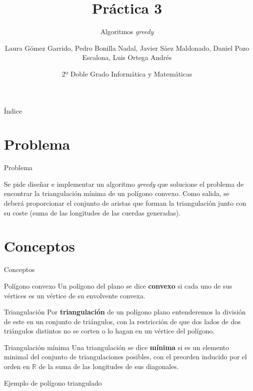 \documentclass[compress]{beamer}
\title{Práctica 3}                                               %
\subtitle{Algoritmos \textit{greedy}}                                  %
\author{Laura Gómez Garrido, Pedro Bonilla Nadal, Javier Sáez Maldonado, Daniel Pozo Escalona, Luis Ortega Andrés}
\date{2º Doble Grado Informática y Matemáticas}                                                            %
\begin{document}
\begin{frame}
\titlepage
\end{frame}

\begin{frame}{Índice}
  \hypertarget{index}{}
  \tableofcontents
  
\end{frame}

\section{Problema}
\begin{frame}{Problema}

	Se pide diseñar e implementar un algoritmo \textit{greedy} que solucione el problema de encontrar la triangulación mínima de un polígono convexo. Como salida, se deberá proporcionar el conjunto de aristas que forman la triangulación junto con su coste (suma de las longitudes de las cuerdas generadas).

\end{frame}	

\section{Conceptos}
\begin{frame}{Conceptos}
	
\begin{block}{Polígono convexo}
Un polígono del plano se dice \textbf{convexo} si cada uno de sus vértices es un vértice de su envolvente convexa.
\end{block}
\pause
\begin{block}{Triangulación}
 Por \textbf{triangulación} de un polígono plano entenderemos la división de este en un conjunto de triángulos, con la restricción de que dos lados de dos triángulos distintos no se corten o lo hagan en un vértice del polígono.
\end{block}
\pause
\begin{block}{Triangulación mínima}
Una triangulación se dice \textbf{mínima} si es un elemento minimal del conjunto de triangulaciones posibles, con el preorden inducido por el orden en $\mathbb{R}$ de la suma de las longitudes de sus diagonales.
\end{block}

\end{frame}


\begin{frame}{Ejemplo de polígono triangulado}
\begin{center}

\end{center}

\end{frame}
\end{document}

